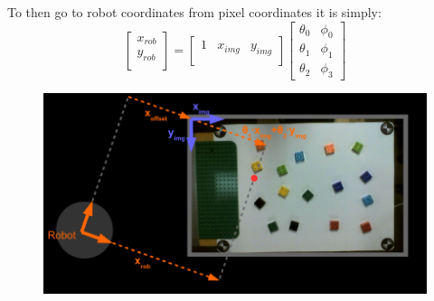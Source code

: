 To then go to robot coordinates from pixel coordinates it is simply:
\begin{equation}
\begin{bmatrix}
x_{rob} \\
y_{rob} \\
\end{bmatrix} 
= 
\begin{bmatrix}
1 & x_{img} & y_{img}\\
\end{bmatrix} 
\begin{bmatrix}
\theta_0 & \phi_0\\
\theta_1 & \phi_1\\
\theta_2 & \phi_3  
\end{bmatrix}  
\end{equation}

\begin{figure}[h]
\centering
\includegraphics[width=\textwidth]{figures/camera_robot_shortcut.png}
\caption{}
\label{fig:camera_robot_shortcut}
\end{figure}
